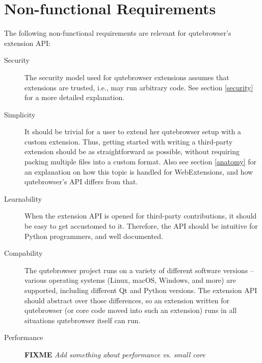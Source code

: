\documentclass[a4paper,parskip=full]{scrreprt}
\newcommand{\fixme}[1]{\textbf{FIXME} \emph{#1}}
\begin{document}
\section{Non-functional Requirements}
The following non-functional requirements are relevant for qutebrowser's
extension API:

\begin{description}
  \item[Security] The security model used for qutebrowser extensions assumes
    that extensions are trusted, i.e., may run arbitrary code. See
    section \ref{security} for a more detailed explanation.
  \item[Simplicity] It should be trivial for a user to extend her qutebrowser
    setup with a custom extension. Thus, getting started with writing a
    third-party extension should be as straightforward as possible, without
    requiring packing multiple files into a custom format. Also see section
    \ref{anatomy} for an explanation on how this topic is handled for
    WebExtensions, and how qutebrowser's API differs from that.
  \item[Learnability] When the extension API is opened for third-party
    contributions, it should be easy to get accustomed to it. Therefore, the API
    should be intuitive for Python programmers, and well documented.
  \item[Compability] The qutebrowser project runs on a variety of different
    software versions -- various operating systems (Linux, macOS, Windows,
    and more) are supported, including different Qt and Python versions. The
    extension API should abstract over those differences, so an extension
    written for qutebrowser (or core code moved into such an extension) runs in
    all situations qutebrowser itself can run.
  \item[Performance] \fixme{Add something about performance vs. small core}
\end{description}

% 
% 
% 
\end{document}
